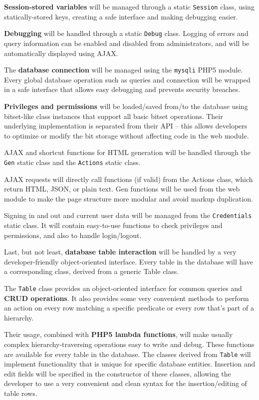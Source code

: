 \documentclass[12pt]{report}
\renewcommand\emph{\textbf}
\begin{document}
                \emph{Session-stored variables} will be managed through a static \texttt{Session} class, using statically-stored keys, creating a safe interface and making debugging easier.

                \emph{Debugging} will be handled through a static \texttt{Debug} class. Logging of errors and query information can be enabled and disabled from administrators, and will be automatically displayed using AJAX.

                The \emph{database connection} will be managed using the \texttt{mysqli} PHP5 module. Every global database operation such as queries and connection will be wrapped in a safe interface that allows easy debugging and prevents security breaches.

                \emph{Privileges and permissions} will be loaded/saved from/to the database using bitset-like class instances that support all basic bitset operations. Their underlying implementation is separated from their API – this allows developers to optimize or modify the bit storage without affecting code in the web module.

                AJAX and shortcut functions for HTML generation will be handled through the \texttt{Gen} static class and the \texttt{Actions} static class.

                AJAX requests will directly call functions (if valid) from the Actions class, which return HTML, JSON, or plain text. Gen functions will be used from the web module to make the page structure more modular and avoid markup duplication.

                Signing in and out and current user data will be managed from the \texttt{Credentials} static class. It will contain easy-to-use functions to check privileges and permissions, and also to handle login/logout.

                Last, but not least, \emph{database table interaction} will be handled by a very developer-friendly object-oriented interface. Every table in the database will have a corresponding class, derived from a generic Table class.

                The \texttt{Table} class provides an object-oriented interface for common queries and \emph{CRUD operations}. It also provides some very convenient methods to perform an action on every row matching a specific predicate or every row that’s part of a hierarchy.

                Their usage, combined with \emph{PHP5 lambda functions}, will make usually complex hierarchy-traversing operations easy to write and debug. These functions are available for every table in the database. The classes derived from \texttt{Table} will implement functionality that is unique for specific database entities. Insertion and edit fields will be specified in the constructor of these classes, allowing the developer to use a very convenient and clean syntax for the insertion/editing of table rows.
\end{document}
